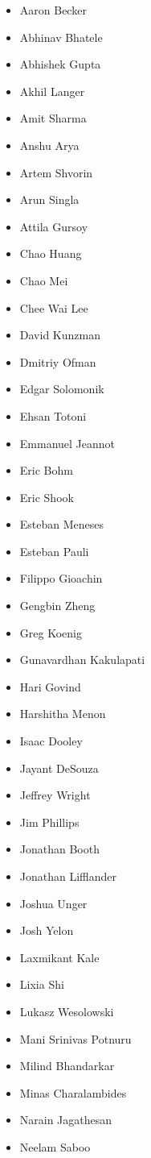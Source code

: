 \begin{itemize}
\item Aaron Becker
\item Abhinav Bhatele
\item Abhishek Gupta
\item Akhil Langer
\item Amit Sharma
\item Anshu Arya
\item Artem Shvorin
\item Arun Singla
\item Attila Gursoy
\item Chao Huang
\item Chao Mei
\item Chee Wai Lee
\item David Kunzman
\item Dmitriy Ofman
\item Edgar Solomonik
\item Ehsan Totoni
\item Emmanuel Jeannot
\item Eric Bohm
\item Eric Shook
\item Esteban Meneses
\item Esteban Pauli
\item Filippo Gioachin
\item Gengbin Zheng
\item Greg Koenig
\item Gunavardhan Kakulapati
\item Hari Govind
\item Harshitha Menon
\item Isaac Dooley
\item Jayant DeSouza
\item Jeffrey Wright
\item Jim Phillips
\item Jonathan Booth
\item Jonathan Lifflander
\item Joshua Unger
\item Josh Yelon
\item Laxmikant Kale
\item Lixia Shi
\item Lukasz Wesolowski
\item Mani Srinivas Potnuru
\item Milind Bhandarkar
\item Minas Charalambides
\item Narain Jagathesan
\item Neelam Saboo

\end{itemize}
